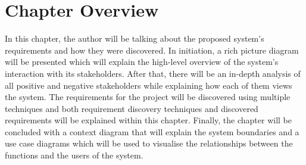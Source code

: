 \section{Chapter Overview}

In this chapter, the author will be talking about the proposed system's requirements and how they were discovered. In initiation, a rich picture diagram will be presented which will explain the high-level overview of the system's interaction with its stakeholders. After that, there will be an in-depth analysis of all positive and negative stakeholders while explaining how each of them views the system. The requirements for the project will be discovered using multiple techniques and both requirement discovery techniques and discovered requirements will be explained within this chapter. Finally, the chapter will be concluded with a context diagram that will explain the system boundaries and a use case diagrams which will be used to visualise the relationships between the functions and the users of the system. 